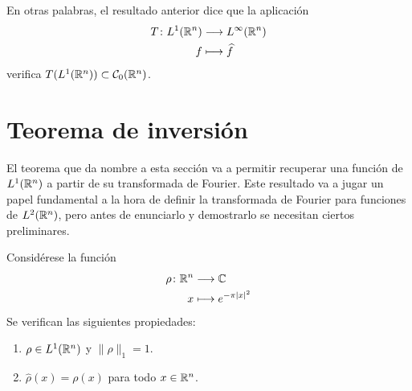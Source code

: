 \documentclass[a4paper, 11pt, oneside]{report}
\begin{document}
En otras palabras, el resultado anterior dice que la aplicación
\[\begin{aligned}[t]
  T \colon L^1(\mathbb R^n) &\longrightarrow L^\infty(\mathbb R^n) \\
  f &\longmapsto \widehat{f}
\end{aligned}\]
verifica $T(L^1(\mathbb R^n)) \subset \mathcal{C}_0(\mathbb R^n)$.

\section{Teorema de inversión}

El teorema que da nombre a esta sección va a permitir recuperar una función de $L^1(\mathbb R^n)$ a partir de su transformada de Fourier. Este resultado va a jugar un papel fundamental a la hora de definir la transformada de Fourier para funciones de $L^2(\mathbb R^n)$, pero antes de enunciarlo y demostrarlo se necesitan ciertos preliminares.

\begin{proposition}
  Considérese la función
  \[
  \begin{aligned}[t]
  \rho \colon \mathbb R^n &\longrightarrow \mathbb C \\
  x &\longmapsto e^{-\pi |x|^2}
  \end{aligned}
  \]
  Se verifican las siguientes propiedades:
  \begin{enumerate}
    \item $\rho \in L^1(\mathbb R^n)$ y $\|\rho\|_1 = 1$.
    \item $\widehat{\rho}(x) = \rho(x)$ para todo $x \in \mathbb R^n$.
  \end{enumerate}
\end{proposition}
\end{document}
